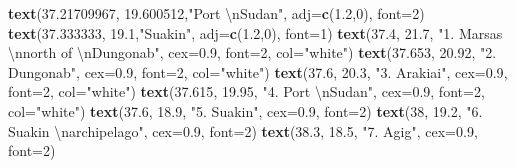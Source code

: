 \documentclass[]{article}
\newenvironment{Shaded}{\begin{snugshade}}{\end{snugshade}}
\newcommand{\KeywordTok}[1]{\textcolor[rgb]{0.13,0.29,0.53}{\textbf{#1}}}
\newcommand{\DataTypeTok}[1]{\textcolor[rgb]{0.13,0.29,0.53}{#1}}
\newcommand{\DecValTok}[1]{\textcolor[rgb]{0.00,0.00,0.81}{#1}}
\newcommand{\FloatTok}[1]{\textcolor[rgb]{0.00,0.00,0.81}{#1}}
\newcommand{\CharTok}[1]{\textcolor[rgb]{0.31,0.60,0.02}{#1}}
\newcommand{\StringTok}[1]{\textcolor[rgb]{0.31,0.60,0.02}{#1}}
\newcommand{\NormalTok}[1]{#1}
\begin{document}
\begin{Shaded}
\begin{Highlighting}[]
\KeywordTok{text}\NormalTok{(}\FloatTok{37.21709967}\NormalTok{, }\FloatTok{19.600512}\NormalTok{,}\StringTok{"Port }\CharTok{\textbackslash{}n}\StringTok{Sudan"}\NormalTok{, }\DataTypeTok{adj=}\KeywordTok{c}\NormalTok{(}\FloatTok{1.2}\NormalTok{,}\DecValTok{0}\NormalTok{), }\DataTypeTok{font=}\DecValTok{2}\NormalTok{)}
\KeywordTok{text}\NormalTok{(}\FloatTok{37.333333}\NormalTok{, }\FloatTok{19.1}\NormalTok{,}\StringTok{"Suakin"}\NormalTok{, }\DataTypeTok{adj=}\KeywordTok{c}\NormalTok{(}\FloatTok{1.2}\NormalTok{,}\DecValTok{0}\NormalTok{), }\DataTypeTok{font=}\DecValTok{1}\NormalTok{)}
\KeywordTok{text}\NormalTok{(}\FloatTok{37.4}\NormalTok{, }\FloatTok{21.7}\NormalTok{, }\StringTok{"1. Marsas }\CharTok{\textbackslash{}n}\StringTok{north of }\CharTok{\textbackslash{}n}\StringTok{Dungonab"}\NormalTok{, }\DataTypeTok{cex=}\FloatTok{0.9}\NormalTok{, }\DataTypeTok{font=}\DecValTok{2}\NormalTok{, }\DataTypeTok{col=}\StringTok{"white"}\NormalTok{)}
\KeywordTok{text}\NormalTok{(}\FloatTok{37.653}\NormalTok{, }\FloatTok{20.92}\NormalTok{, }\StringTok{"2. Dungonab"}\NormalTok{, }\DataTypeTok{cex=}\FloatTok{0.9}\NormalTok{, }\DataTypeTok{font=}\DecValTok{2}\NormalTok{, }\DataTypeTok{col=}\StringTok{"white"}\NormalTok{)}
\KeywordTok{text}\NormalTok{(}\FloatTok{37.6}\NormalTok{, }\FloatTok{20.3}\NormalTok{, }\StringTok{"3. Arakiai"}\NormalTok{, }\DataTypeTok{cex=}\FloatTok{0.9}\NormalTok{, }\DataTypeTok{font=}\DecValTok{2}\NormalTok{, }\DataTypeTok{col=}\StringTok{"white"}\NormalTok{)}
\KeywordTok{text}\NormalTok{(}\FloatTok{37.615}\NormalTok{, }\FloatTok{19.95}\NormalTok{, }\StringTok{"4. Port }\CharTok{\textbackslash{}n}\StringTok{Sudan"}\NormalTok{, }\DataTypeTok{cex=}\FloatTok{0.9}\NormalTok{, }\DataTypeTok{font=}\DecValTok{2}\NormalTok{, }\DataTypeTok{col=}\StringTok{"white"}\NormalTok{)}
\KeywordTok{text}\NormalTok{(}\FloatTok{37.6}\NormalTok{, }\FloatTok{18.9}\NormalTok{, }\StringTok{"5. Suakin"}\NormalTok{, }\DataTypeTok{cex=}\FloatTok{0.9}\NormalTok{, }\DataTypeTok{font=}\DecValTok{2}\NormalTok{)}
\KeywordTok{text}\NormalTok{(}\DecValTok{38}\NormalTok{, }\FloatTok{19.2}\NormalTok{, }\StringTok{"6. Suakin }\CharTok{\textbackslash{}n}\StringTok{archipelago"}\NormalTok{, }\DataTypeTok{cex=}\FloatTok{0.9}\NormalTok{, }\DataTypeTok{font=}\DecValTok{2}\NormalTok{)}
\KeywordTok{text}\NormalTok{(}\FloatTok{38.3}\NormalTok{, }\FloatTok{18.5}\NormalTok{, }\StringTok{"7. Agig"}\NormalTok{, }\DataTypeTok{cex=}\FloatTok{0.9}\NormalTok{, }\DataTypeTok{font=}\DecValTok{2}\NormalTok{)}


\end{Highlighting}
\end{Shaded}
\end{document}
